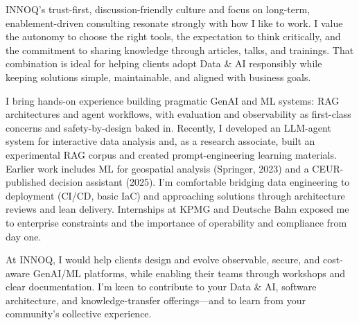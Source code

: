 INNOQ’s trust-first, discussion-friendly culture and focus on long-term, enablement-driven consulting resonate strongly with how I like to work. I value the autonomy to choose the right tools, the expectation to think critically, and the commitment to sharing knowledge through articles, talks, and trainings. That combination is ideal for helping clients adopt Data & AI responsibly while keeping solutions simple, maintainable, and aligned with business goals.

I bring hands-on experience building pragmatic GenAI and ML systems: RAG architectures and agent workflows, with evaluation and observability as first-class concerns and safety-by-design baked in. Recently, I developed an LLM-agent system for interactive data analysis and, as a research associate, built an experimental RAG corpus and created prompt-engineering learning materials. Earlier work includes ML for geospatial analysis (Springer, 2023) and a CEUR-published decision assistant (2025). I’m comfortable bridging data engineering to deployment (CI/CD, basic IaC) and approaching solutions through architecture reviews and lean delivery. Internships at KPMG and Deutsche Bahn exposed me to enterprise constraints and the importance of operability and compliance from day one.

At INNOQ, I would help clients design and evolve observable, secure, and cost-aware GenAI/ML platforms, while enabling their teams through workshops and clear documentation. I’m keen to contribute to your Data & AI, software architecture, and knowledge-transfer offerings—and to learn from your community’s collective experience.